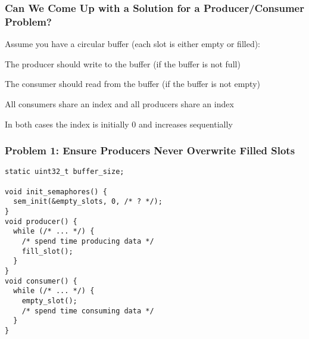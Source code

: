  \begin{frame}
    \frametitle{Can We Come Up with a Solution for a Producer/Consumer Problem?}

    Assume you have a circular buffer (each slot is either empty or filled):

    \vspace{2em}


    \vspace{2em}

    The producer should write to the buffer (if the buffer is not full)

    \vspace{2em}

    The consumer should read from the buffer (if the buffer is not empty)

    \vspace{2em}

    All consumers share an index and all producers share an index

    \hspace{2em} In both cases the index is initially 0 and increases
                 sequentially
  \end{frame}

  \begin{frame}[fragile]
    \frametitle{Problem 1: Ensure Producers Never Overwrite Filled Slots}

    \begin{lstlisting}
static uint32_t buffer_size;

void init_semaphores() {
  sem_init(&empty_slots, 0, /* ? */);
}
void producer() {
  while (/* ... */) {
    /* spend time producing data */
    fill_slot();
  }
}
void consumer() {
  while (/* ... */) {
    empty_slot();
    /* spend time consuming data */
  }
}
    \end{lstlisting}
  \end{frame}

